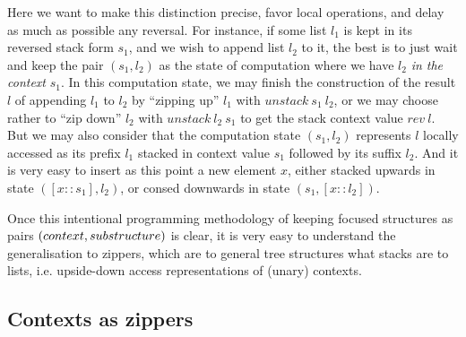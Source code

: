Here we want to make this distinction precise, favor local operations, and
delay as much as possible any reversal. For instance, if some list $l_1$
is kept in its reversed stack form $s_1$, and we wish to append list 
$l_2$ to it,
the best is to just wait and keep the pair $(s_1,l_2)$ as the state
of computation where we have $l_2$ {\sl in the context} $s_1$. 
In this computation
state, we may finish the construction of the result $l$ of appending 
$l_1$ to $l_2$ by ``zipping up'' $l_1$ with $unstack~s_1~l_2$, 
or we may choose rather to ``zip down'' $l_2$ with $unstack~l_2~s_1$ 
to get the stack context value $rev~l$. But we may also consider that
the computation state $(s_1,l_2)$ represents $l$ locally accessed
as its prefix $l_1$ stacked in context value $s_1$ followed
by its suffix $l_2$. And it is very easy to insert as this point a new
element $x$, either stacked upwards in state $([x::s_1],l_2)$, 
or consed downwards in state $(s_1,[x::l_2])$. 

Once this intentional programming methodology of keeping focused structures
as pairs $(context,sub\-structure)$ is clear, it is very easy to understand the
generalisation to zippers, which are to general tree structures what stacks are
to lists, i.e. upside-down access representations of (unary) contexts.

\subsection{Contexts as zippers}

